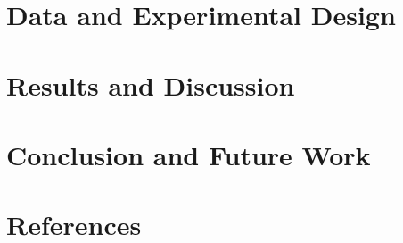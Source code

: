 \documentclass[12pt]{ai_conquer2026}
\begin{document}
\section{Data and Experimental Design}
\label{sec:experiments}






\section{Results and Discussion}
\label{sec:results}

\section{Conclusion and Future Work}
\label{sec:conclusion_future_work}


\newpage
\section{References}
\label{section:references}
\nocite{*}
\vspace{-3.2em}
\printbibliography
\end{document}
